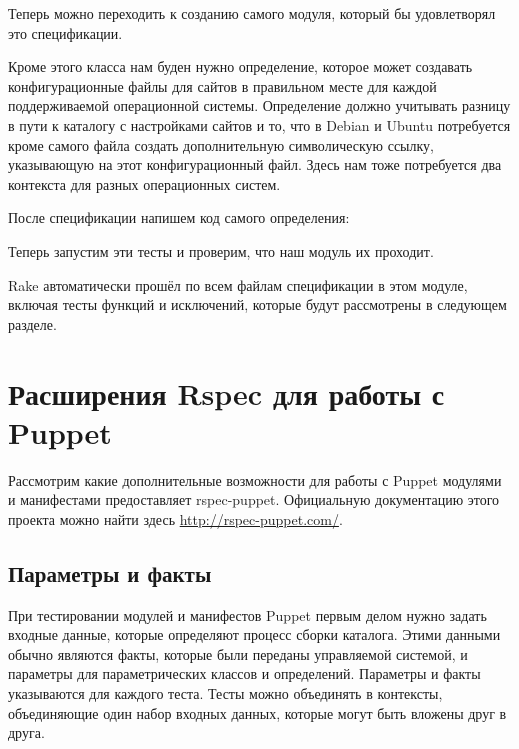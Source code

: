 

Теперь можно переходить к созданию самого модуля, который бы удовлетворял это спецификации.



Кроме этого класса нам буден нужно определение, которое может создавать конфигурационные файлы для сайтов в правильном месте для каждой поддерживаемой операционной системы.
Определение должно учитывать разницу в пути к каталогу с настройками сайтов и то, что в Debian и Ubuntu потребуется кроме самого файла создать дополнительную символическую ссылку, указывающую на этот конфигурационный файл. Здесь нам тоже потребуется два контекста для разных операционных систем.



После спецификации напишем код самого определения:



Теперь запустим эти тесты и проверим, что наш модуль их проходит.



Rake автоматически прошёл по всем файлам спецификации в этом модуле, включая тесты функций и исключений, которые будут рассмотрены в следующем разделе.


\section{Расширения Rspec для работы с Puppet}

Рассмотрим какие дополнительные возможности для работы с Puppet модулями и манифестами предоставляет rspec-puppet. Официальную документацию этого проекта можно найти здесь \url{http://rspec-puppet.com/}.

\subsection{Параметры и факты}

При тестировании модулей и манифестов Puppet первым делом нужно задать входные данные, которые определяют процесс сборки каталога. Этими данными обычно являются факты, которые были переданы управляемой системой, и параметры для параметрических классов и определений. Параметры и факты указываются для каждого теста. Тесты можно объединять в контексты, объединяющие один набор входных данных, которые могут быть вложены друг в друга.

